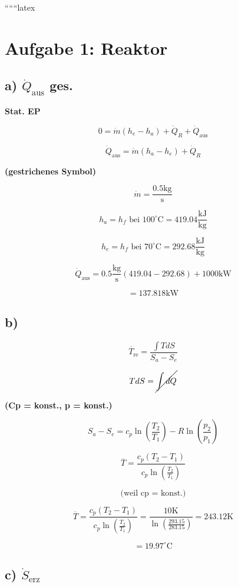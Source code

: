 
``````latex


\section*{Aufgabe 1: Reaktor}

\subsection*{a) $\dot{Q}_{\text{aus}}$ ges.}

\textbf{Stat. EP}

\[
0 = \dot{m} (h_e - h_a) + \dot{Q}_R + \dot{Q}_{\text{aus}}
\]

\[
\dot{Q}_{\text{aus}} = \dot{m} (h_a - h_e) + \dot{Q}_R
\]

\textbf{(gestrichenes Symbol)}

\[
\dot{m} = \frac{0.5 \text{kg}}{\text{s}}
\]

\[
h_a = h_f \text{ bei } 100^\circ \text{C} = 419.04 \frac{\text{kJ}}{\text{kg}}
\]

\[
h_e = h_f \text{ bei } 70^\circ \text{C} = 292.68 \frac{\text{kJ}}{\text{kg}}
\]

\[
\dot{Q}_{\text{aus}} = 0.5 \frac{\text{kg}}{\text{s}} (419.04 - 292.68) + 1000 \text{kW}
\]

\[
= 137.818 \text{kW}
\]

\subsection*{b)}

\[
\overline{T}_{\text{re}} = \frac{\int T dS}{S_a - S_e}
\]

\[
T dS = \cancel{\int dQ}
\]

\textbf{(Cp = konst., p = konst.)}

\[
S_a - S_e = c_p \ln \left( \frac{T_2}{T_1} \right) - R \ln \left( \frac{p_2}{p_1} \right)
\]

\[
\overline{T} = \frac{c_p (T_2 - T_1)}{c_p \ln \left( \frac{T_2}{T_1} \right)}
\]

\[
\text{(weil cp = konst.)}
\]

\[
\overline{T} = \frac{c_p (T_2 - T_1)}{c_p \ln \left( \frac{T_2}{T_1} \right)} = \frac{10 \text{K}}{\ln \left( \frac{293.15}{283.15} \right)} = 243.12 \text{K}
\]

\[
= 19.97^\circ \text{C}
\]

\subsection*{c) $\dot{S}_{\text{erz}}$}


